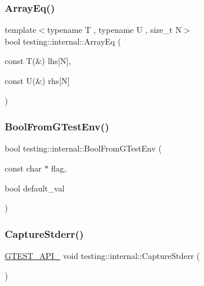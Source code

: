 \mbox{\label{namespacetesting_1_1internal_a5cb6f81ee827130024261121c742b26c}} 
\subsubsection{\texorpdfstring{ArrayEq()}{ArrayEq()}\hspace{0.1cm}{\footnotesize\ttfamily [3/3]}}
{\footnotesize\ttfamily template$<$typename T , typename U , size\+\_\+t N$>$ \\
bool testing\+::internal\+::\+Array\+Eq (\begin{DoxyParamCaption}\item[{const T(\&)}]{lhs\mbox{[}\+N\mbox{]},  }\item[{const U(\&)}]{rhs\mbox{[}\+N\mbox{]} }\end{DoxyParamCaption})\hspace{0.3cm}{\ttfamily [inline]}}

\mbox{\label{namespacetesting_1_1internal_a67132cdce23fb71b6c38ee34ef81eb4c}} 
\subsubsection{\texorpdfstring{BoolFromGTestEnv()}{BoolFromGTestEnv()}}
{\footnotesize\ttfamily bool testing\+::internal\+::\+Bool\+From\+G\+Test\+Env (\begin{DoxyParamCaption}\item[{const char $\ast$}]{flag,  }\item[{bool}]{default\+\_\+val }\end{DoxyParamCaption})}

\mbox{\label{namespacetesting_1_1internal_a8ec00d458d0d442bd64af7b5f9c22dda}} 
\subsubsection{\texorpdfstring{CaptureStderr()}{CaptureStderr()}}
{\footnotesize\ttfamily \mbox{\hyperlink{gtest-port_8h_aa73be6f0ba4a7456180a94904ce17790}{G\+T\+E\+S\+T\+\_\+\+A\+P\+I\+\_\+}} void testing\+::internal\+::\+Capture\+Stderr (\begin{DoxyParamCaption}{ }\end{DoxyParamCaption})}

